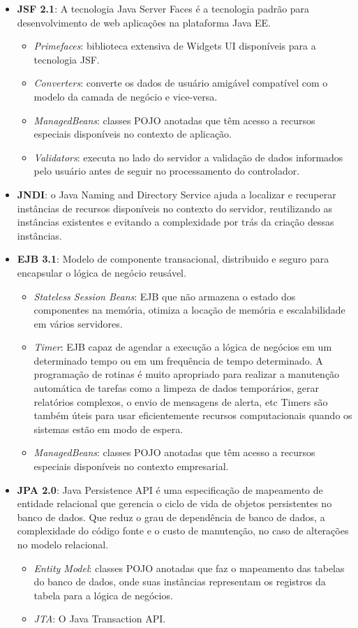 \documentclass[envcountsame,envcountchap]{svmono}
\begin{document}
\begin{itemize}
\item \textbf{JSF 2.1}: A tecnologia Java Server Faces é a tecnologia padrão para desenvolvimento de web aplicações na plataforma Java EE.
   \begin{itemize}
   \item \textit{Primefaces}: biblioteca extensiva de Widgets UI 
   disponíveis para a tecnologia JSF.
   \item \textit{Converters}: converte os dados de usuário amigável compatível com o modelo da camada de negócio e vice-versa. 
   \item \textit{ManagedBeans}: classes POJO anotadas que têm
   acesso a recursos especiais disponíveis no
   contexto de aplicação.
   \item \textit{Validators}: executa no lado do servidor a validação de dados informados pelo usuário antes de seguir no processamento do controlador.
   \end{itemize}
\item \textbf{JNDI}: o Java Naming and Directory Service ajuda a localizar e recuperar instâncias de recursos disponíveis no contexto do servidor, reutilizando as instâncias existentes e evitando a complexidade por trás da criação dessas instâncias.
\item \textbf{EJB 3.1}: Modelo de componente transacional, distribuido e seguro para encapsular o lógica de negócio reusável.
   \begin{itemize}
   \item \textit{Stateless Session Beans}: EJB que não armazena o estado dos componentes na memória, otimiza a locação de memória e escalabilidade em vários servidores.
   \item \textit{Timer}: EJB capaz de agendar a
    execução a lógica de negócios em um determinado tempo ou em um
    frequência de tempo determinado. A programação de rotinas é
    muito apropriado para realizar a manutenção automática
    de tarefas como a limpeza de dados temporários, gerar
    relatórios complexos, o envio de mensagens de alerta, etc Timers
    são também úteis para usar eficientemente recursos computacionais
    quando os sistemas estão em modo de espera.
   \item \textit{ManagedBeans}: classes POJO anotadas que têm
    acesso a recursos especiais disponíveis no contexto empresarial.
   \end{itemize}
\item \textbf{JPA 2.0}: Java Persistence API é uma especificação de mapeamento de entidade relacional que gerencia o ciclo de vida de objetos persistentes no banco de dados. Que reduz o grau de dependência de banco de dados, a complexidade do código fonte e o custo de manutenção, no caso de alterações no modelo relacional.
   \begin{itemize}
   \item \textit{Entity Model}: classes POJO anotadas que faz o mapeamento das tabelas do banco de dados, onde suas instâncias representam os registros da tabela para a lógica de negócios.
   \item \textit{JTA}: O Java Transaction API.
   \end{itemize}
\end{itemize}
\end{document}
